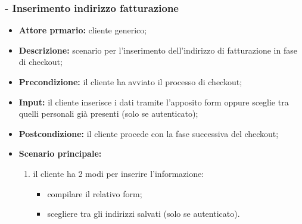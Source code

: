 \subsubsection{ - Inserimento indirizzo fatturazione}
\begin{itemize}
    \item \textbf{Attore prmario:} cliente generico;
    \item \textbf{Descrizione:} scenario per l'inserimento dell'indirizzo di fatturazione in fase di checkout;
    \item \textbf{Precondizione:} il cliente ha avviato il processo di checkout;
    \item \textbf{Input:} il cliente inserisce i dati tramite l'apposito form oppure sceglie tra quelli personali già presenti (solo se autenticato);
    \item \textbf{Postcondizione:} il cliente procede con la fase successiva del checkout;
    \item \textbf{Scenario principale:}
          \begin{enumerate}
              \item il cliente ha 2 modi per inserire l'informazione:
                    \begin{itemize}
                        \item compilare il relativo form;
                        \item scegliere tra gli indirizzi salvati (solo se autenticato).
                    \end{itemize}
          \end{enumerate}
\end{itemize}

\stepsubUserCase
